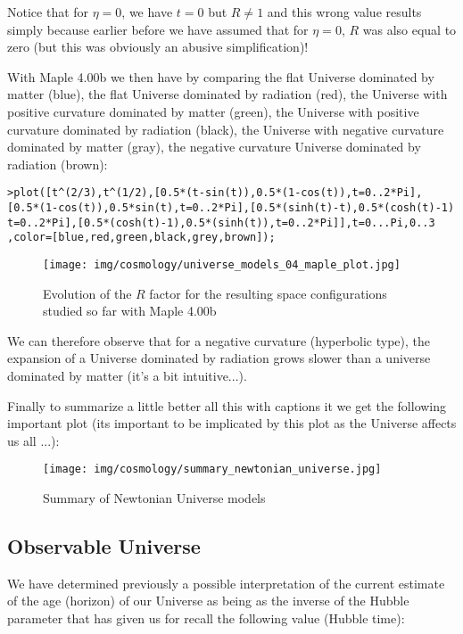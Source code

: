 	\begin{tcolorbox}[title=Remark,colframe=black,arc=10pt]
	Notice that for $\eta=0$, we have $t=0$ but $R\neq 1$ and this wrong value results simply because earlier before we have assumed that for $\eta=0$, $R$ was also equal to zero (but this was obviously an abusive simplification)!
	\end{tcolorbox}
	With Maple 4.00b we then have by comparing the flat Universe dominated by matter (blue), the flat Universe dominated by radiation (red), the Universe with positive curvature dominated by matter (green), the Universe with positive curvature dominated by radiation (black), the Universe with negative curvature dominated by matter (gray), the negative curvature Universe dominated by radiation (brown):
	
	\texttt{>plot([t\string^(2/3),t\string^(1/2),[0.5*(t-sin(t)),0.5*(1-cos(t)),t=0..2*Pi],}\\
	\texttt{[0.5*(1-cos(t)),0.5*sin(t),t=0..2*Pi],[0.5*(sinh(t)-t),0.5*(cosh(t)-1)}\\
	\texttt{t=0..2*Pi],[0.5*(cosh(t)-1),0.5*(sinh(t)),t=0..2*Pi]],t=0...Pi,0..3
,color=[blue,red,green,black,grey,brown]);}
	\begin{figure}[H]
		\centering
		\texttt{[image: img/cosmology/universe\_models\_04\_maple\_plot.jpg]}
		\caption[]{Evolution of the $R$ factor for the resulting space configurations studied so far with Maple 4.00b}
	\end{figure}
	We can therefore observe that for a negative curvature (hyperbolic type), the expansion of a Universe dominated by radiation grows slower than a universe dominated by matter (it's a bit intuitive...).

	Finally to summarize a little better all this with captions it we get the following important plot (its important to be implicated by this plot as the Universe affects us all ...):
	\begin{figure}[H]
		\centering
		\texttt{[image: img/cosmology/summary\_newtonian\_universe.jpg]}
		\caption{Summary of Newtonian Universe models}
	\end{figure}
	
	\subsection{Observable Universe}
	We have determined previously a possible interpretation of the current estimate of the age (horizon) of our Universe as being as the inverse of the Hubble parameter that has given us for recall the following value (Hubble time):
	

